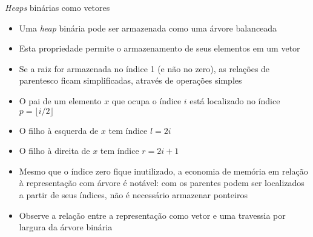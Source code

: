 \begin{frame}[fragile]{\textit{Heaps} binárias como vetores}

    \begin{itemize}
        \item Uma \textit{heap} binária pode ser armazenada como uma árvore balanceada

        \item Esta propriedade permite o armazenamento de seus elementos em um vetor

        \item Se a raiz for armazenada no índice 1 (e não no zero), as relações de parentesco
            ficam simplificadas, através de operações simples

        \item O pai de um elemento $x$ que ocupa o índice $i$ está localizado no índice 
            $p = \lfloor i/2\rfloor$

        \item O filho à esquerda de $x$ tem índice $l = 2i$
        \item O filho à direita  de $x$ tem índice $r = 2i + 1$

        \item Mesmo que o índice zero fique inutilizado, a economia de memória em relação à 
            representação com árvore é notável: com os parentes podem ser localizados a partir
            de seus índices, não é necessário armazenar ponteiros

        \item Observe a relação entre a representação como vetor e uma travessia por largura
            da árvore binária
    \end{itemize}

\end{frame}

